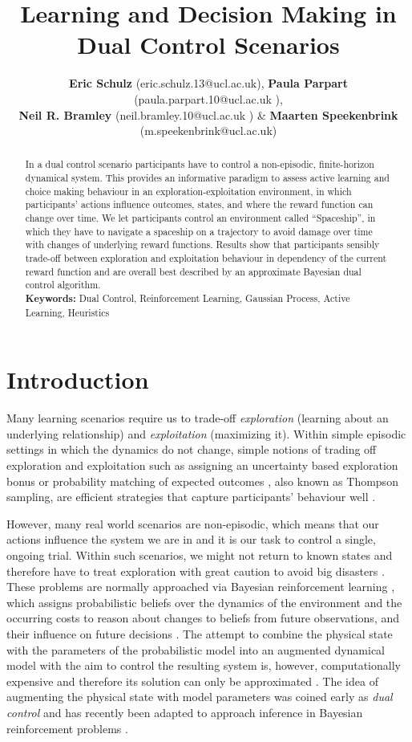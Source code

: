 \documentclass[10pt,letterpaper]{article}
\title{Learning and Decision Making in Dual Control Scenarios}
\author{\textbf{Eric Schulz} (eric.schulz.13@ucl.ac.uk), \textbf{Paula Parpart} (paula.parpart.10@ucl.ac.uk ),\\ \textbf{Neil R. Bramley} (neil.bramley.10@ucl.ac.uk ) \& \textbf{Maarten Speekenbrink} (m.speekenbrink@ucl.ac.uk)}
\begin{document}
\maketitle


\begin{abstract}
In a dual control scenario participants have to control a non-episodic, finite-horizon dynamical system. This provides an informative paradigm to assess active learning and choice making behaviour in an exploration-exploitation environment, in which participants' actions influence outcomes, states, and where the reward function can change over time. We let participants control an environment called ``Spaceship'',  in which they have to navigate a spaceship on a trajectory to avoid damage over time with changes of underlying reward functions. Results show that participants sensibly trade-off between exploration and exploitation behaviour in dependency of the current reward function and are overall best described by an approximate Bayesian dual control algorithm.\\
\textbf{Keywords:} 
Dual Control, Reinforcement Learning, Gaussian Process, Active Learning, Heuristics
\end{abstract}
\section{Introduction}
Many learning scenarios require us to trade-off \emph{exploration} (learning about an underlying relationship) and \emph{exploitation} (maximizing it). Within simple episodic settings in which the dynamics do not change, simple notions of trading off exploration and exploitation such as assigning an uncertainty based exploration bonus \citep{srinivas2009gaussian} or probability matching of expected outcomes \citep{agrawal2011analysis}, also known as Thompson sampling, are efficient strategies that capture participants' behaviour well \citep{schulzlearning, schulzexploration}.

However, many real world scenarios are non-episodic, which means that our actions influence the system we are in and it is our task to control a single, ongoing trial. Within such scenarios, we might not return to known states and therefore have to treat exploration with great caution to avoid big disasters \citep{klenske2015dual}. These problems are normally approached via Bayesian reinforcement learning \citep{poupart2010bayesian}, which assigns probabilistic beliefs over the dynamics of the environment and the occurring costs to reason about changes to beliefs from future observations, and their influence on future decisions \citep{duff2002optimal}. The attempt to combine the physical state with the parameters of the probabilistic model into an augmented dynamical model with the aim to control the resulting system is, however, computationally expensive \citep{hennig2011optimal} and therefore its solution can only be approximated \citep{vlassis2012bayesian}. The idea of augmenting the physical state with model parameters was coined early as \emph{dual control} \citep{feldbaum1960dual} and has recently been adapted to approach inference in Bayesian reinforcement problems \citep{klenske2015dual}.
 
\end{document}
